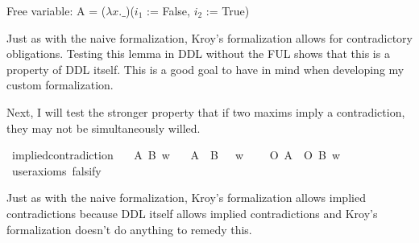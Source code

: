 \begin{isabellebody}
{  Free variable:
    A = ($\lambda x. \_$)($i_1$ := False, $i_2$ := True) \color{black}%
}%
\endisatagproof
{\isafoldproof}%
%
\isadelimproof
%
\endisadelimproof
%
\begin{isamarkuptext}%
Just as with the naive formalization, Kroy's formalization allows for contradictory obligations. 
        Testing this lemma in DDL without the FUL shows that this is a property of DDL itself. This is a good goal to have in mind when 
        developing my custom formalization. 

        Next, I will test the stronger property that if two maxims imply a
        contradiction, they may not be simultaneously willed.%
\end{isamarkuptext}\isamarkuptrue%
\isamarkupfalse%
\ implied{\isacharunderscore}contradiction{\isacharcolon}\isanewline
\ \ \ A\ B\ w\isanewline
\ \ \ {\isachardoublequoteopen}{\isacharparenleft}{\isacharparenleft}A\ \isactrlbold {\isasymand}\ B{\isacharparenright}\ \isactrlbold {\isasymrightarrow}\ \isactrlbold {\isasymbottom}{\isacharparenright}\ w{\isachardoublequoteclose}\isanewline
\ \ \ {\isachardoublequoteopen}\isactrlbold {\isasymnot}\ {\isacharparenleft}O\ {\isacharbraceleft}A{\isacharbraceright}\ \isactrlbold {\isasymand}\ O\ {\isacharbraceleft}B{\isacharbraceright}{\isacharparenright}\ w{\isachardoublequoteclose}\isanewline
\ \ \isamarkupfalse%
\ {\isacharbrackleft}user{\isacharunderscore}axioms{\isacharcomma}\ falsify{\isacharbrackright}%
\isadelimproof
\ %
\endisadelimproof
%
\isatagproof
{}\isamarkupfalse%
\isanewline
%
%
\endisatagproof
{\isafoldproof}%
%
\isadelimproof
%
\endisadelimproof
%
\begin{isamarkuptext}%
Just as with the naive formalization, Kroy's formalization allows implied contradictions because 
        DDL itself allows implied contradictions and Kroy's 
        formalization doesn't do anything to remedy this. 


\end{isamarkuptext}
\end{isabellebody}
